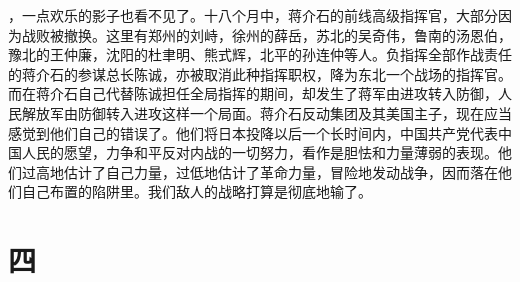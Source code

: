 ，一点欢乐的影子也看不见了。十八个月中，蒋介石的前线高级指挥官，大部分因为战败被撤换。这里有郑州的刘峙，徐州的薛岳，苏北的吴奇伟，鲁南的汤恩伯，豫北的王仲廉，沈阳的杜聿明、熊式辉，北平的孙连仲等人。负指挥全部作战责任的蒋介石的参谋总长陈诚，亦被取消此种指挥职权，降为东北一个战场的指挥官。而在蒋介石自己代替陈诚担任全局指挥的期间，却发生了蒋军由进攻转入防御，人民解放军由防御转入进攻这样一个局面。蒋介石反动集团及其美国主子，现在应当感觉到他们自己的错误了。他们将日本投降以后一个长时间内，中国共产党代表中国人民的愿望，力争和平反对内战的一切努力，看作是胆怯和力量薄弱的表现。他们过高地估计了自己力量，过低地估计了革命力量，冒险地发动战争，因而落在他们自己布置的陷阱里。我们敌人的战略打算是彻底地输了。

\section*{四}

